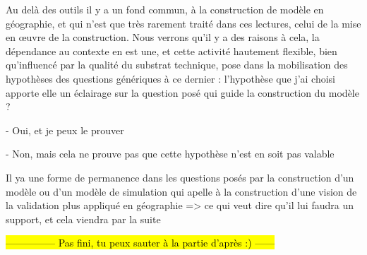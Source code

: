 Au delà des outils il y a un fond commun, à la construction de modèle en géographie, et qui n'est que très rarement traité dans ces lectures, celui de la mise en œuvre de la construction. Nous verrons qu'il y a des raisons à cela, la dépendance au contexte en est une, et cette activité hautement flexible, bien qu'influencé par la qualité du substrat technique, pose dans la mobilisation des hypothèses des questions génériques à ce dernier : l'hypothèse que j'ai choisi apporte elle un éclairage sur la question posé qui guide la construction du modèle ?

- Oui, et je peux le prouver 

- Non, mais cela ne prouve pas que cette hypothèse n'est en soit pas valable 

Il ya une forme de permanence dans les questions posés par la construction d'un modèle ou d'un modèle de simulation qui apelle à la construction d'une vision de la validation plus appliqué en géographie => ce qui veut dire qu'il lui faudra un support, et cela viendra par la suite

\hl{--------------- Pas fini, tu peux sauter à la partie d'après :) ------}

